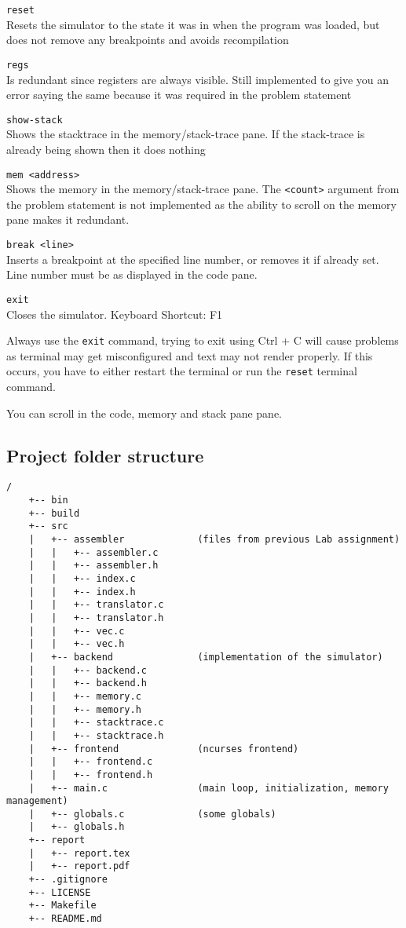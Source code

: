 \documentclass[12pt]{article}
\begin{document}
	\verb|reset|\\
	Resets the simulator to the state it was in when the program was loaded, but does not remove any breakpoints and avoids recompilation

	\verb|regs|\\
	Is redundant since registers are always visible. Still implemented to give you an error saying the same because it was required in the problem statement

	\verb|show-stack|\\
	Shows the stacktrace in the memory/stack-trace pane. If the stack-trace is already being shown then it does nothing

	\verb|mem <address>|\\
	Shows the memory in the memory/stack-trace pane. The \verb|<count>| argument from the problem statement is not implemented as the ability to scroll on the memory pane makes it redundant.

	\verb|break <line>|\\
	Inserts a breakpoint at the specified line number, or removes it if already set. Line number must be as displayed in the code pane.

	\verb|exit|\\
	Closes the simulator. Keyboard Shortcut: F1
	
	Always use the \verb|exit| command, trying to exit using Ctrl + C will cause problems as terminal may get misconfigured and text may not render properly. If this occurs, you have to either restart the terminal or run the \verb|reset| terminal command.

	You can scroll in the code, memory and stack pane pane.

	\subsection{Project folder structure}
	
	\begin{verbatim}/
	+-- bin
	+-- build
	+-- src
	|   +-- assembler             (files from previous Lab assignment)
	|   |   +-- assembler.c
	|   |   +-- assembler.h
	|   |   +-- index.c
	|   |   +-- index.h
	|   |   +-- translator.c
	|   |   +-- translator.h
	|   |   +-- vec.c
	|   |   +-- vec.h
	|   +-- backend               (implementation of the simulator)
	|   |   +-- backend.c
	|   |   +-- backend.h
	|   |   +-- memory.c
	|   |   +-- memory.h
	|   |   +-- stacktrace.c
	|   |   +-- stacktrace.h
	|   +-- frontend              (ncurses frontend)
	|   |   +-- frontend.c
	|   |   +-- frontend.h
	|   +-- main.c                (main loop, initialization, memory management)
	|   +-- globals.c             (some globals)
	|   +-- globals.h
	+-- report
	|   +-- report.tex
	|   +-- report.pdf
	+-- .gitignore
	+-- LICENSE
	+-- Makefile
	+-- README.md\end{verbatim}
\end{document}
